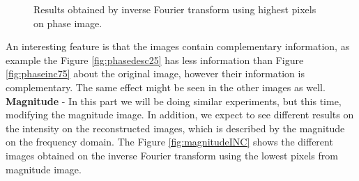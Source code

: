 \documentclass[12pt,a4paper]{article}
\begin{document}
\begin{figure}[!h]
{{		}
		\label{fig:phasedesc50}
	}
	\quad

	\caption{Results obtained by inverse Fourier transform using highest pixels on phase image.}
	\label{fig:phaseDESC}
\end{figure}

An interesting feature is that the images contain complementary information, as example the Figure \ref{fig:phasedesc25} has less information than Figure \ref{fig:phaseinc75} about the original image, however their information is complementary. The same effect might be seen in the other images as well. \\

\textbf{ Magnitude} -  In this part we will be doing similar experiments, but this time, modifying the magnitude image. In addition, we expect to see different results on the intensity on the reconstructed images, which is described by the magnitude on the frequency domain. The Figure \ref{fig:magnitudeINC} shows the different images obtained on the inverse Fourier transform using the lowest pixels from magnitude image. \\
\end{document}
